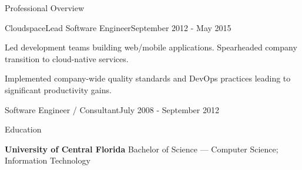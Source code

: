 \documentclass{resume} %
\begin{document}
\begin{rSection}{Professional Overview}
  \begin{rNewRole}{Cloudspace}{Lead Software Engineer}{September 2012 - May 2015}
    
    \item Led development teams building web/mobile applications. Spearheaded company transition to cloud-native services.
    \item Implemented company-wide quality standards and DevOps practices leading to significant productivity gains.
    
  \end{rNewRole}
  
  
  \begin{rCompany}{Software Engineer / Consultant}{July 2008 - September 2012}{}

  \end{rCompany}
  
  
  
\end{rSection}

\vspace{0.5em} %
\begin{rSection}{Education}
  
  {\bf University of Central Florida } Bachelor of Science --- Computer Science; Information Technology
  
\end{rSection}
\end{document}
